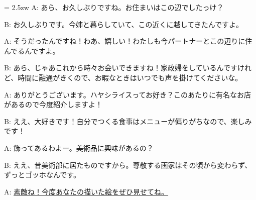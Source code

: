 \documentclass[11pt]{amsart}
\title{}
\author{}
\newenvironment{hangall}[1]{\hangindent = 2.5zw\everypar{\hangindent = 2.5zw}}{}
\begin{document}
\maketitle
\begin{hangall}{}%
A: あら、お久しぶりですね。お住まいはこの辺でしたっけ？

B: お久しぶりです。今姉と暮らしていて、この近くに越してきたんですよ。

A: そうだったんですね！わあ、嬉しい！わたしも今パートナーとこの辺りに住んでるんですよ。

B: あら、じゃあこれから時々お会いできますね！家政婦をしているんですけれど、時間に融通がきくので、お暇なときはいつでも声を掛けてくださいな。

A: ありがとうございます。ハヤシライスってお好き？このあたりに有名なお店があるので今度紹介しますよ！

B: ええ、大好きです！自分でつくる食事はメニューが偏りがちなので、楽しみです！

A: 飾ってあるわよー。美術品に興味があるの？

B: ええ、昔美術部に居たものですから。尊敬する画家はその頃から変わらず、ずっとゴッホなんです。

A: \ul{素敵ね！今度あなたの描いた絵をぜひ見せてね。}\end{hangall}
\end{document}
